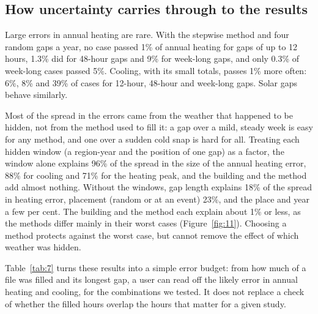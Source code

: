 \subsection{How uncertainty carries through to the results}\label{sec:5.7}

Large errors in annual heating are rare. With the stepwise method and four random gaps a year, no case passed 1\% of annual heating for gaps of up to 12 hours, 1.3\% did for 48-hour gaps and 9\% for week-long gaps, and only 0.3\% of week-long cases passed 5\%. Cooling, with its small totals, passes 1\% more often: 6\%, 8\% and 39\% of cases for 12-hour, 48-hour and week-long gaps. Solar gaps behave similarly.

Most of the spread in the errors came from the weather that happened to be hidden, not from the method used to fill it: a gap over a mild, steady week is easy for any method, and one over a sudden cold snap is hard for all. Treating each hidden window (a region-year and the position of one gap) as a factor, the window alone explains 96\% of the spread in the size of the annual heating error, 88\% for cooling and 71\% for the heating peak, and the building and the method add almost nothing. Without the windows, gap length explains 18\% of the spread in heating error, placement (random or at an event) 23\%, and the place and year a few per cent. The building and the method each explain about 1\% or less, as the methods differ mainly in their worst cases (Figure~\ref{fig:11}). Choosing a method protects against the worst case, but cannot remove the effect of which weather was hidden.

Table~\ref{tab:7} turns these results into a simple error budget: from how much of a file was filled and its longest gap, a user can read off the likely error in annual heating and cooling, for the combinations we tested. It does not replace a check of whether the filled hours overlap the hours that matter for a given study.

